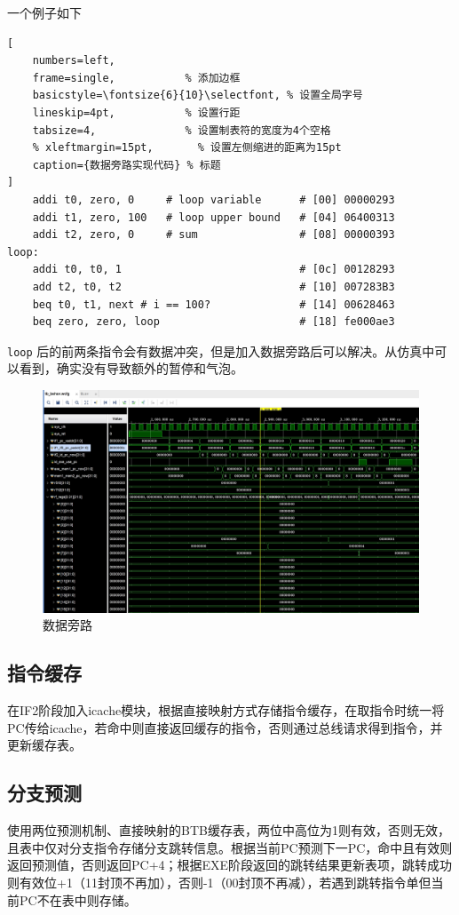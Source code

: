 \documentclass[12pt,a4paper,oneside]{ctexart}
\begin{document}
一个例子如下
\begin{lstlisting}[
    numbers=left,
    frame=single,           % 添加边框
    basicstyle=\fontsize{6}{10}\selectfont, % 设置全局字号
    lineskip=4pt,           % 设置行距
    tabsize=4,              % 设置制表符的宽度为4个空格
    % xleftmargin=15pt,       % 设置左侧缩进的距离为15pt
    caption={数据旁路实现代码} % 标题
] 
    addi t0, zero, 0     # loop variable      # [00] 00000293
    addi t1, zero, 100   # loop upper bound   # [04] 06400313
    addi t2, zero, 0     # sum                # [08] 00000393
loop:
    addi t0, t0, 1                            # [0c] 00128293
    add t2, t0, t2                            # [10] 007283B3
    beq t0, t1, next # i == 100?              # [14] 00628463
    beq zero, zero, loop                      # [18] fe000ae3
\end{lstlisting}

\texttt{loop} 后的前两条指令会有数据冲突，但是加入数据旁路后可以解决。从仿真中可以看到，确实没有导致额外的暂停和气泡。

\begin{figure}[H]
    \centering
    \includegraphics[scale=0.18]{assets/data-forwarding.png}
    \caption{数据旁路}
    \label{fig:data-forwarding}
\end{figure}

\subsection{指令缓存}
在IF2阶段加入icache模块，根据直接映射方式存储指令缓存，在取指令时统一将PC传给icache，若命中则直接返回缓存的指令，否则通过总线请求得到指令，并更新缓存表。

\subsection{分支预测}
使用两位预测机制、直接映射的BTB缓存表，两位中高位为1则有效，否则无效，且表中仅对分支指令存储分支跳转信息。根据当前PC预测下一PC，命中且有效则返回预测值，否则返回PC+4；根据EXE阶段返回的跳转结果更新表项，跳转成功则有效位+1（11封顶不再加），否则-1（00封顶不再减），若遇到跳转指令单但当前PC不在表中则存储。
\end{document}
